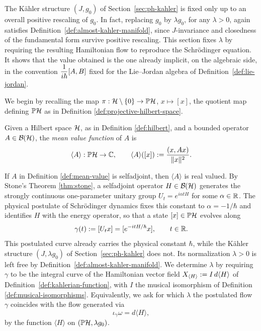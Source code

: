 The Kähler structure $(J,g_0)$ of Section~\ref{sec:ph-kahler} is fixed only up to an overall positive rescaling of $g_0$. In fact, replacing $g_0$ by $\lambda g_0$, for any $\lambda>0$, again satisfies Definition~\ref{def:almost-kahler-manifold}, since $J$-invariance and closedness of the fundamental form survive positive rescaling. This section fixes $\lambda$ by requiring the resulting Hamiltonian flow to reproduce the Schrödinger equation. It shows that the value obtained is the one already implicit, on the algebraic side, in the convention $\dfrac{1}{i\hbar}[A,B]$ fixed for the Lie--Jordan algebra of Definition~\ref{def:lie-jordan}.

\noindent We begin by recalling the map $\pi:\H\setminus\{0\}\to\PH$, $x\mapsto[x]$, the quotient map defining $\PH$ as in Definition \ref{def:projective-hilbert-space}.

\begin{definition}
	\label{def:mean-value}
	Given a Hilbert space $\H$, as in Definition \ref{def:hilbert}, and a bounded operator $A\in\BH$, the \emph{mean value function} of $A$ is
	\[
	\langle A\rangle : \PH \to \C, \qquad
	\langle A\rangle([x]) := \frac{(x,Ax)}{\|x\|^2}.
	\]
\end{definition}

\noindent If $A$ in Definition \ref{def:mean-value} is selfadjoint, then $\langle A\rangle$ is real valued. By Stone's Theorem \ref{thm:stone}, a selfadjoint operator $H\in\BH$ generates the strongly continuous one-parameter unitary group $U_t=e^{i\alpha tH}$ for some $\alpha\in\mathbb{R}$. The physical postulate of Schrödinger dynamics fixes this constant to $\alpha=-1/\hbar$ and identifies $H$ with the energy operator, so that a state $[x]\in\PH$ evolves along
\[
\gamma(t):=[U_tx]=[e^{-itH/\hbar}x], \qquad t\in\mathbb{R}.
\]
This postulated curve already carries the physical constant $\hbar$, while the Kähler structure $(J,\lambda g_0)$ of Section~\ref{sec:ph-kahler} does not. Its normalization $\lambda>0$ is left free by Definition~\ref{def:almost-kahler-manifold}. We determine $\lambda$ by requiring $\gamma$ to be the integral curve of the Hamiltonian vector field $X_{\langle H\rangle}:=I\,d\langle H\rangle$ of Definition~\ref{def:kahlerian-function}, with $I$ the musical isomorphism of Definition \ref{def:musical-isomorphisms}. Equivalently, we ask for which $\lambda$ the postulated flow $\gamma$ coincides with the flow generated via $$\iota_{\dot\gamma}\omega=d\langle H\rangle,$$ by the function $\langle H\rangle$ on $(\PH,\lambda g_0)$.

